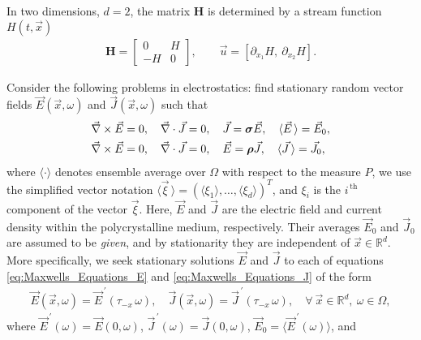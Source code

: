 \documentclass[11pt]{amsart}
\newcommand{\Hb}{\mathbf{H}}
\newcommand\bsig{\mbox{\boldmath${\sigma}$}}
\newcommand\brho{\mbox{\boldmath${\rho}$}}
\begin{document}
In two dimensions, $d=2$, the matrix $\Hb$ is determined by a stream
function $H(t,\vec{x})$ 
%
\begin{align}\label{eq:u_H}  
  \Hb=\left[
  \begin{array}{cc}
    0  & H\\
    -H & 0
  \end{array}
  \right],
  \qquad
  \vec{u}=[\partial_{x_1}H, \ \partial_{x_2}H].
\end{align}
%

\newpage

Consider the following problems in electrostatics: find stationary
random vector fields $\vec{E}(\vec{x},\omega)$ and $\vec{J}(\vec{x},\omega)$
such that
%
\begin{align}   \label{eq:Maxwells_Equations_E}  
 &\vec{\nabla}\times\vec{E}=0, \quad
  \vec{\nabla}\cdot\vec{J}=0,\quad
  \vec{J}=\bsig\vec{E},\quad
  \langle\vec{E}\,\rangle=\vec{E}_0, \\
%
  \label{eq:Maxwells_Equations_J}
   &\vec{\nabla}\times\vec{E}=0, \quad
   \vec{\nabla}\cdot\vec{J}=0, \quad
   \vec{E}=\brho\vec{J},\quad
   \langle\vec{J}\,\rangle=\vec{J}_0,
\end{align}
%
where $\langle\cdot\rangle$ denotes ensemble average over $\Omega$ with respect to the
measure $P$,
we use the
simplified vector notation $\langle\vec{\xi}\,\rangle=(\langle\xi_1\rangle,\ldots,\langle\xi_d\rangle)^T$, and $\xi_i$ is
the $i^{\,\text{th}}$ component of the vector $\vec{\xi}$. Here,
$\vec{E}$ and $\vec{J}$ are the electric field and current density within
the polycrystalline medium, respectively. Their averages $\vec{E}_0$
and $\vec{J}_0$ are assumed to be \emph{given}, and by stationarity they are
independent of $\vec{x}\in\mathbb{R}^d$.  More specifically, we seek
stationary solutions $\vec{E}$ and $\vec{J}$ to each of equations
\eqref{eq:Maxwells_Equations_E} and \eqref{eq:Maxwells_Equations_J} of
the form    
%
\begin{align}\label{eq:Stationary_E_J}
  \vec{E}(\vec{x},\omega)=\vec{E}^{\,\prime}(\tau_{-x}\,\omega), \quad
  \vec{J}(\vec{x},\omega)=\vec{J}^{\,\prime}(\tau_{-x}\,\omega), \quad
  \forall \ \vec{x}\in\mathbb{R}^d, \ \omega\in\Omega,
\end{align}
%
where $\vec{E}^{\,\prime}(\omega)=\vec{E}(0,\omega)$, $\vec{J}^{\,\prime}(\omega)=\vec{J}(0,\omega)$,
$\vec{E}_0=\langle\vec{E}^{\,\prime}(\omega)\rangle$, and
\end{document}
